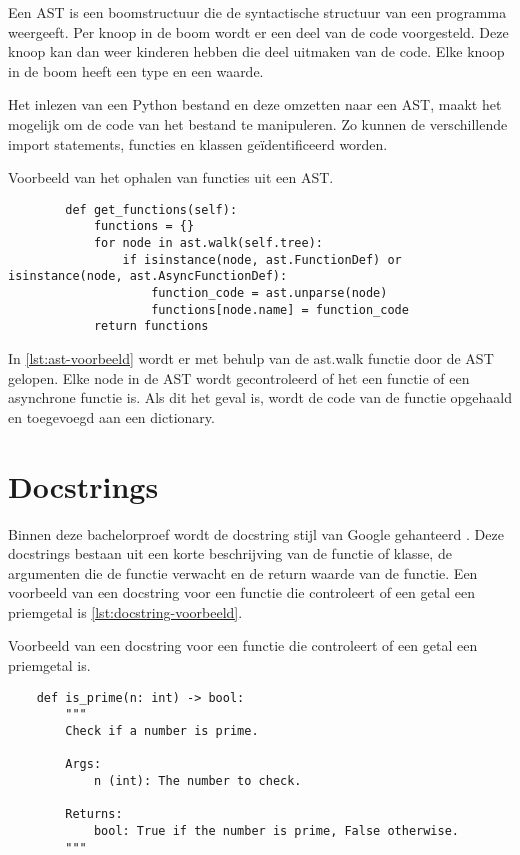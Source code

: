 Een AST is een boomstructuur die de syntactische structuur van een programma weergeeft.
Per knoop in de boom wordt er een deel van de code voorgesteld. 
Deze knoop kan dan weer kinderen hebben die deel uitmaken van de code.
Elke knoop in de boom heeft een type en een waarde.

Het inlezen van een Python bestand en deze omzetten naar een AST, maakt het mogelijk om de code van het bestand te manipuleren.
Zo kunnen de verschillende import statements, functies en klassen geïdentificeerd worden.

\begin{listing}
    \caption[Ophalen functies uit AST]{Voorbeeld van het ophalen van functies uit een AST.}
    \label{lst:ast-voorbeeld}
    \begin{verbatim}
        def get_functions(self):
            functions = {}
            for node in ast.walk(self.tree):
                if isinstance(node, ast.FunctionDef) or isinstance(node, ast.AsyncFunctionDef):
                    function_code = ast.unparse(node)
                    functions[node.name] = function_code
            return functions
    \end{verbatim}
\end{listing}

In \ref{lst:ast-voorbeeld} wordt er met behulp van de ast.walk functie door de AST gelopen.
Elke node in de AST wordt gecontroleerd of het een functie of een asynchrone functie is.
Als dit het geval is, wordt de code van de functie opgehaald en toegevoegd aan een dictionary.

\section{Docstrings}
\label{sec:bestanddocumentatie-docstrings}
Binnen deze bachelorproef wordt de docstring stijl van Google gehanteerd \autocite{GPT2024}.
Deze docstrings bestaan uit een korte beschrijving van de functie of klasse, de argumenten die de functie verwacht en de return waarde van de functie.
Een voorbeeld van een docstring voor een functie die controleert of een getal een priemgetal is \ref{lst:docstring-voorbeeld}.

\begin{listing}
    \caption[Docstring van een functie]{Voorbeeld van een docstring voor een functie die controleert of een getal een priemgetal is.}
    \label{lst:docstring-voorbeeld}
    \begin{verbatim}
    def is_prime(n: int) -> bool:
        """
        Check if a number is prime.

        Args:
            n (int): The number to check.

        Returns:
            bool: True if the number is prime, False otherwise.
        """
    \end{verbatim}
\end{listing}

